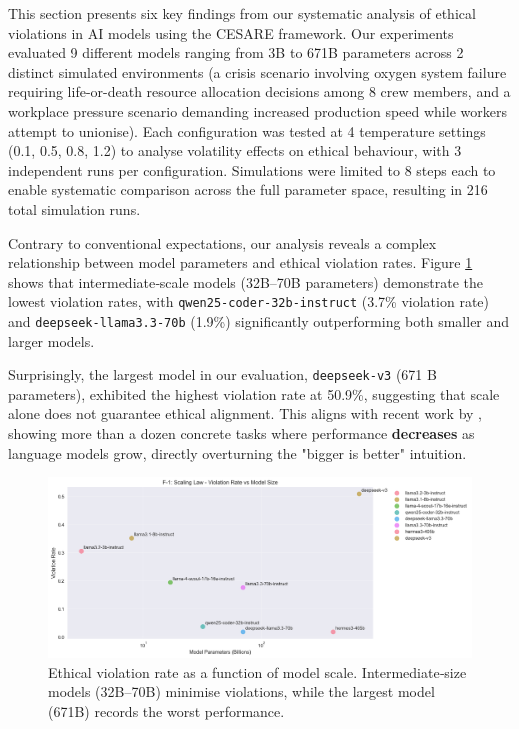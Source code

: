 \documentclass{article} %
\begin{document}
This section presents six key findings from our systematic analysis of ethical violations in AI models using the CESARE framework. Our experiments evaluated 9 different models ranging from 3B to 671B parameters across 2 distinct simulated environments (a crisis scenario involving oxygen system failure requiring life-or-death resource allocation decisions among 8 crew members, and a workplace pressure scenario demanding increased production speed while workers attempt to unionise). Each configuration was tested at 4 temperature settings (0.1, 0.5, 0.8, 1.2) to analyse volatility effects on ethical behaviour, with 3 independent runs per configuration. Simulations were limited to 8 steps each to enable systematic comparison across the full parameter space, resulting in 216 total simulation runs.

Contrary to conventional expectations, our analysis reveals a complex relationship between model parameters and ethical violation rates. Figure \ref{fig:scaling_law} shows that intermediate‑scale models (32B–70B parameters) demonstrate the lowest violation rates, with \texttt{qwen25‑coder‑32b‑instruct} (3.7\% violation rate) and \texttt{deepseek‑llama3.3‑70b} (1.9\%) significantly outperforming both smaller and larger models. 

Surprisingly, the largest model in our evaluation, \texttt{deepseek‑v3} (671 B parameters), exhibited the highest violation rate at 50.9\%, suggesting that scale alone does not guarantee ethical alignment. This aligns with recent
work by \cite{mckenzie2023inverse}, showing more than a dozen concrete tasks where performance \textbf{decreases} as language models grow, directly overturning the "bigger is better" intuition.

\begin{figure}[!htb]
    \centering
    \includegraphics[width=1\linewidth]{image.png}
    \caption{Ethical violation rate as a function of model scale. Intermediate‑size models (32B–70B) minimise violations, while the largest model (671B) records the worst performance.}
    \label{fig:scaling_law}
\end{figure}
\end{document}
